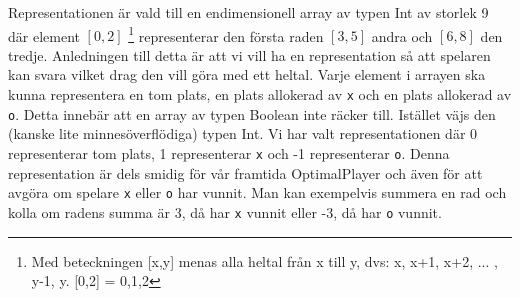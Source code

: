 Representationen är vald till en endimensionell array av typen Int av storlek 9 där element $[0,2]$ \footnote{Med beteckningen [x,y] menas alla heltal från x till y, dvs: x, x+1, x+2, ... , y-1, y. [0,2] = {0,1,2}} representerar den första raden $[3,5]$ andra och $[6,8]$ den tredje. Anledningen till detta är att vi vill ha en representation så att spelaren kan svara vilket drag den vill göra med ett heltal.
Varje element i arrayen ska kunna representera en tom plats, en plats allokerad av \texttt{x} och en plats allokerad av \texttt{o}. Detta innebär att en array av typen Boolean inte räcker till. Istället väjs den (kanske lite minnesöverflödiga) typen Int. Vi har valt representationen där 0 representerar tom plats, 1 representerar \texttt{x} och -1 representerar \texttt{o}. Denna representation är dels smidig för vår framtida OptimalPlayer och även för att avgöra om spelare \texttt{x} eller \texttt{o} har vunnit. Man kan exempelvis summera en rad och kolla om radens summa är 3, då har \texttt{x} vunnit eller -3, då har \texttt{o} vunnit.

